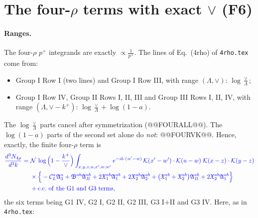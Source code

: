 \documentclass[10pt]{article}
\numberwithin{equation}{section}
\newcommand{\new}[1]{{\color{blue}#1}}
\newcommand{\CL}{\mathcal C_L}
\newcommand{\KK}{\mathcal K}
\newcommand{\NN}{\mathcal N}
\newcommand{\phw}{e^{-ik\cdot(w'-w)}}
\begin{document}
\section{The four-\texorpdfstring{$\rho$}{rho} terms with exact \texorpdfstring{$\vee$}{vee} (F6)}\label{sec:four}
\paragraph{Ranges.} The four-$\rho$ $p^+$ integrands are exactly $\propto\frac{1}{p^+}$. The lines of Eq.~(4rho) of \texttt{4rho.tex} come from:
\begin{itemize}
\item Group I Row I (two lines) and Group I Row III, with range $(\Lambda,\vee)$: $\log\frac{\vee}{\Lambda}$;
\item Group I Row IV, Group II Rows I, II, III and Group III Rows I, II, IV, with range $(\Lambda,\vee-k^+)$: $\log\frac{\vee}{\Lambda}+\log(1-a)$.
\end{itemize}
The $\log\frac{\vee}{\Lambda}$ parts cancel after symmetrization (@@FOURALL@@). The $\log(1-a)$ parts of the second set alone do \emph{not}: @@FOURVK@@. Hence, exactly, the finite four-$\rho$ term is
\begin{equation}
\new{\begin{aligned}\frac{d^3N_{4\rho}}{d^3k}={}&\NN\,\log\Big(1-\frac{k^+}{\vee}\Big)\int_{x,y,z,u,x',w,w'}\phw\,\KK(x'-w')\cdot\KK(u-w)\;\KK(x-z)\cdot\KK(y-z)\\
&\times\Big\{-\CL^a\mathfrak A_3^a+\mathfrak B^{ab}\mathfrak A_B^{ab}+2\mathfrak X_1^{ab}\mathfrak A_1^{ab}+2\mathfrak X_2^{ab}\mathfrak A_2^{ab}+\big(\mathfrak X_1^{ab}+\mathfrak X_2^{ab}\big)\mathfrak A_B^{ab}+2\mathfrak X_2^{ab}\mathfrak A_1^{ab}\Big\}\\
&+{\rm c.c.\ of\ the\ G1\ and\ G3\ terms},\end{aligned}}
\label{eq:four}
\end{equation}
the six terms being G1 IV, G2 I, G2 II, G2 III, G3 I$+$II and G3 IV. Here, as in \texttt{4rho.tex}:
\end{document}
